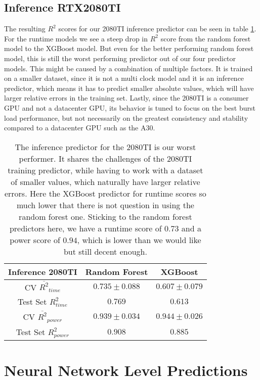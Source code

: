 \subsection{Inference RTX2080TI}

The resulting $R^2$ scores for our 2080TI inference predictor can be seen in table \ref{tab:pred_res_2080_inf}. For the runtime models we see a steep drop in $R^2$ score from the random forest model to the XGBoost model. But even for the better performing random forest model, this is still the worst performing predictor out of our four predictor models. This might be caused by a combination of multiple factors. It is trained on a smaller dataset, since it is not a multi clock model and it is an inference predictor, which means it has to predict smaller absolute values, which will have larger relative errors in the training set. Lastly, since the 2080TI is a consumer GPU and not a datacenter GPU, its behavior is tuned to focus on the best burst load performance, but not necessarily on the greatest consistency and stability compared to a datacenter GPU such as the A30.


\begin{table}[h!]
\centering
\begin{tabular}{|c|c|c|}
\hline
 \textbf{Inference 2080TI}& \textbf{Random Forest} & \textbf{XGBoost} \\
\hline
CV $\overline{R^2}_{time}$ & $0.735 \pm 0.088$ &  $0.607 \pm 0.079$ \\
\hline
Test Set $R^2_{time}$ & $0.769$ & $0.613$ \\
\hline
CV $\overline{R^2}_{power}$ & $0.939 \pm 0.034$  &  $0.944 \pm 0.026$\\
\hline
Test Set $R^2_{power}$ & $0.908$ & $0.885$ \\
\hline
\end{tabular}
\caption{The inference predictor for the 2080TI is our worst performer. It shares the challenges of the 2080TI training predictor, while having to work with a dataset of smaller values, which naturally have larger relative errors. Here the XGBoost predictor for runtime scores so much lower that there is not question in using the random forest one. Sticking to the random forest predictors here, we have a runtime score of $0.73$ and a power score of $0.94$, which is lower than we would like but still decent enough.}
\label{tab:pred_res_2080_inf}
\end{table}


\section{Neural Network Level Predictions}


